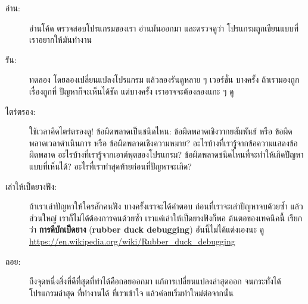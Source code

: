\begin{description}


\item[อ่าน:] อ่านโค้ด ตรวจสอบโปรแกรมของเรา อ่านมันออกมา
และตรวจดูว่า โปรแกรมถูกเขียนแบบที่เราอยากให้มันทำงาน


\item[รัน:]
ทดลอง โดยลองเปลี่ยนแปลงโปรแกรม แล้วลองรันดูหลาย ๆ เวอร์ชั่น
บางครั้ง ถ้าเรามองถูกเรื่องถูกที่ ปัญหาก็จะเห็นได้ชัด
แต่บางครั้ง เราอาจจะต้องลองแกะ ๆ ดู


\item[ไตร่ตรอง:] ใช้เวลาคิดไตร่ตรองดู! ข้อผิดพลาดเป็นชนิดไหน: ข้อผิดพลาดเชิงวากยสัมพันธ์
หรือ ข้อผิดพลาดเวลาดำเนินการ
หรือ ข้อผิดพลาดเชิงความหมาย?
อะไรบ้างที่เรารู้จากข้อความแสดงข้อผิดพลาด
อะไรบ้างที่เรารู้จากเอาต์พุตของโปรแกรม?
ข้อผิดพลาดชนิดไหนที่จะทำให้เกิดปัญหาแบบที่เห็นได้?
อะไรที่เราทำสุดท้ายก่อนที่ปัญหาจะเกิด?



\item[เล่าให้เป็ดยางฟัง:] ถ้าเราเล่าปัญหาให้ใครสักคนฟัง
บางครั้งเราจะได้คำตอบ ก่อนที่เราจะเล่าปัญหาจบด้วยซ้ำ
แล้วส่วนใหญ่ เราก็ไม่ได้ต้องการคนด้วยซ้ำ
เราแค่เล่าให้เป็ดยางฟังก็พอ
ต้นตอของเทคนิคนี้ เรียกว่า \textbf{การดีบักเป็ดยาง} (\textbf{rubber duck debugging})
อันนี้ไม่ได้แต่งเองนะ ดู \url{https://en.wikipedia.org/wiki/Rubber_duck_debugging}


\item[ถอย:] ถึงจุดหนึ่งสิ่งที่ดีที่สุดที่ทำได้คือถอยออกมา
แก้การเปลี่ยนแปลงล่าสุดออก จนกระทั่งได้โปรแกรมล่าสุด ที่ทำงานได้ ที่เราเข้าใจ
แล้วค่อยเริ่มทำใหม่ต่อจากนั้น

\end{description}

